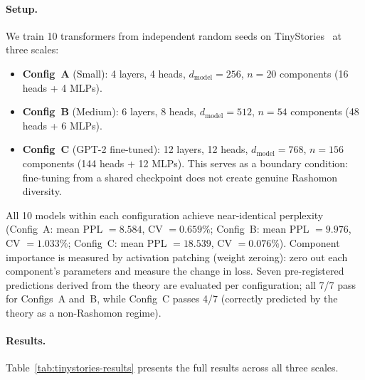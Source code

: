 \documentclass{article}
\begin{document}
\paragraph{Setup.}
We train 10 transformers from independent random seeds on TinyStories~\citep{eldan2023tinystories} at three scales:
\begin{itemize}
  \item \textbf{Config~A} (Small): 4 layers, 4 heads, $d_{\text{model}} = 256$, $n = 20$ components (16 heads + 4 MLPs).
  \item \textbf{Config~B} (Medium): 6 layers, 8 heads, $d_{\text{model}} = 512$, $n = 54$ components (48 heads + 6 MLPs).
  \item \textbf{Config~C} (GPT-2 fine-tuned): 12 layers, 12 heads, $d_{\text{model}} = 768$, $n = 156$ components (144 heads + 12 MLPs). This serves as a boundary condition: fine-tuning from a shared checkpoint does not create genuine Rashomon diversity.
\end{itemize}
All 10 models within each configuration achieve near-identical perplexity (Config~A: mean PPL $= 8.584$, CV $= 0.659\%$; Config~B: mean PPL $= 9.976$, CV $= 1.033\%$; Config~C: mean PPL $= 18.539$, CV $= 0.076\%$).
Component importance is measured by activation patching (weight zeroing): zero out each component's parameters and measure the change in loss.
Seven pre-registered predictions derived from the theory are evaluated per configuration; all 7/7 pass for Configs~A and~B, while Config~C passes 4/7 (correctly predicted by the theory as a non-Rashomon regime).

\paragraph{Results.}
Table~\ref{tab:tinystories-results} presents the full results across all three scales.
\end{document}
